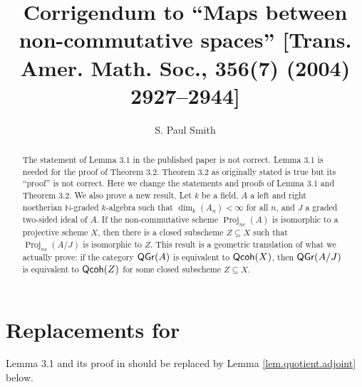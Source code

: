 \documentclass[10pt]{amsart}
\numberwithin{equation}{section}
\def\NN{{\mathbb N}}
\def\dim{\operatorname{dim}}
\def\Projnc{\operatorname{Proj}_{nc}}
\def\QGr{\operatorname{\sf QGr}}
\def\Qcoh{{\sf Qcoh}}
\begin{document}
\title[Corrigendum: Maps between non-commutative spaces]{Corrigendum to  
``Maps between non-commutative spaces''  
[Trans. Amer. Math. Soc.,
356(7) (2004) 2927--2944]}

\author{S. Paul Smith}

\address{ Department of Mathematics, Box 354350, Univ.
Washington, Seattle, WA 98195}

 













\begin{abstract}
The statement of Lemma 3.1 in the published paper is not correct. Lemma 3.1 is needed for the proof of 
Theorem 3.2. Theorem 3.2 as originally stated is  true but its ``proof'' is not correct. 
Here we change the statements and proofs of Lemma 3.1 and Theorem 3.2. 
We also prove a new result. Let $k$ be a field, $A$ a left and right noetherian 
$\NN$-graded $k$-algebra such that $\dim_k(A_n)< \infty$ for all $n$, and $J$ a graded two-sided ideal of $A$. 
If the non-commutative scheme $\Projnc(A)$ is isomorphic to a projective scheme $X$, then there is a closed subscheme
$Z \subseteq X$ such that  $\Projnc(A/J)$ is isomorphic to $Z$. This result is a geometric translation of what we actually prove: if the category $\QGr(A)$ is equivalent to $\Qcoh(X)$, then $\QGr(A/J)$ is equivalent to $\Qcoh(Z)$ for
some closed subscheme $Z \subseteq X$.
\end{abstract}




\maketitle




\section{Replacements for \cite[Lem. 3.1 and Thm. 3.2]{S}}

 
Lemma 3.1 and its proof in \cite{S} should be replaced by Lemma \ref{lem.quotient.adjoint} below.
\end{document}
